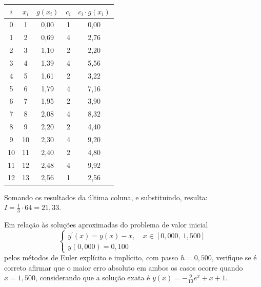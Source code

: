 \documentclass[12pt,a4paper]{article}
\begin{document}
\begin{ExerciseList}
\medskip
\begin{center}
\begin{tabular}{|c|c|c|c|c|}
\hline 
$i$ & $x_i$ & $g(x_i)$ & $c_i$ & $c_i \cdot g(x_i)$ \\ 
\hline \hline 
0  &  1 & 0,00 & 1 & 0,00 \\ 
\hline 
1  &  2 & 0,69 & 4 & 2,76 \\ 
\hline 
2  &  3 & 1,10 & 2 & 2,20 \\ 
\hline 
3  &  4 & 1,39 & 4 & 5,56 \\ 
\hline 
4  &  5 & 1,61 & 2 & 3,22 \\ 
\hline 
5  &  6 & 1,79 & 4 & 7,16 \\ 
\hline 
6  &  7 & 1,95 & 2 & 3,90 \\ 
\hline 
7  &  8 & 2,08 & 4 & 8,32 \\ 
\hline 
8  &  9 & 2,20 & 2 & 4,40 \\ 
\hline 
9  & 10 & 2,30 & 4 & 9,20 \\ 
\hline 
10 & 11 & 2,40 & 2 & 4,80 \\ 
\hline 
11 & 12 & 2,48 & 4 & 9,92 \\ 
\hline 
12 & 13 & 2,56 & 1 & 2,56 \\ 
\hline 
\end{tabular}
\end{center}
\medskip
Somando os resultados da última coluna, e substituindo, resulta:
$I = \frac{1}{3} \cdot 64 = 21,33$.

\Exercise[title={3,0}]
Em relação às soluções aproximadas do problema de valor inicial
\[
\begin{cases}
y^\prime(x) = y(x)-x, \quad x \in [0,000, \ 1,500]\\
y(0,000) = 0,100
\end{cases}
\]
pelos métodos de Euler explícito e implícito, com passo $h=0,500$, verifique se é correto afirmar que o maior erro absoluto em ambos os casos ocorre quando $x = 1,500$, considerando que a solução exata é $y(x) = -\frac{9}{10} e^x + x + 1$.


\end{ExerciseList}
\end{document}
